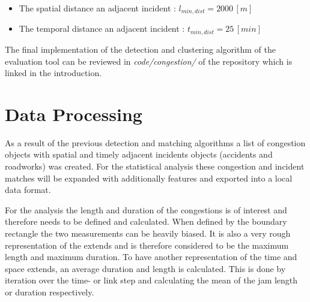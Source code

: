 \begin{itemize}
	\item The spatial distance an adjacent incident : $l_{min,dist} = 2000 \,[m]$
	\item The temporal distance an adjacent incident : $t_{min,dist} = 25 \,[min]$
\end{itemize}

\bigskip

\bigskip

The final implementation of the detection and clustering algorithm of the evaluation tool can be reviewed in \textit{code/congestion/} of the repository which is linked in the introduction. 

\section{Data Processing}
\label{methodology_data_processing}
As a result of the previous detection and matching algorithms a list of congestion objects with spatial and timely adjacent incidents objects (accidents and roadworks) was created. For the statistical analysis these congestion and incident matches will be expanded with additionally features and exported into a local data format.

For the analysis the length and duration of the congestions is of interest and therefore needs to be defined and calculated. When defined by the boundary rectangle the two measurements can be heavily biased. It is also a very rough representation of the extends and is therefore considered to be the maximum length and maximum duration. To have another representation of the time and space extends, an average duration and length is calculated. This is done by iteration over the time- or link step and calculating the mean of the jam length or duration respectively.

